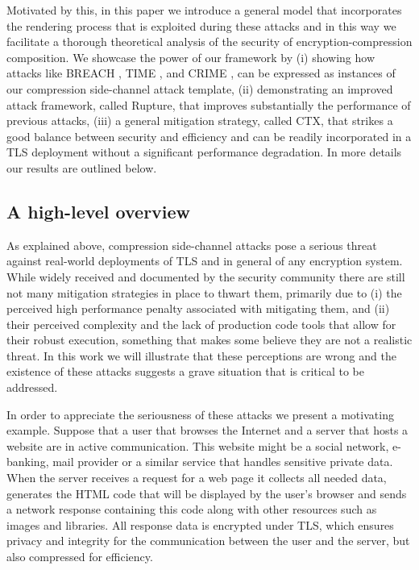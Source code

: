 \documentclass[conference, letterpaper, 10pt]{IEEEtran}
\begin{document}
Motivated by this, in this paper we introduce
a general model that incorporates the rendering process that is exploited
during these attacks and in this way we facilitate a thorough
theoretical analysis of the security of encryption-compression composition.
We showcase the power of our framework by (i) showing how attacks like  BREACH \cite{c2}, TIME \cite{c3}, and CRIME \cite{c4}, can be expressed
as instances of our compression side-channel attack template,
(ii) demonstrating an improved attack framework, called Rupture,
that improves substantially the performance of previous attacks,
(iii) a general mitigation strategy, called CTX, that strikes
a good balance between security and efficiency and can be readily incorporated
in a TLS deployment without a significant performance degradation.
In more details our results are outlined below.

\subsection{A high-level overview}\label{subsec:example}
As explained above,  compression side-channel attacks pose a serious threat
against real-world deployments of TLS and in general of
any encryption system. While widely received and documented
by the security community there are still not many mitigation strategies in place
to thwart them, primarily due to (i) the perceived high performance
penalty associated with mitigating them, and
(ii) their perceived complexity and
the lack of production code tools
that allow for their robust execution, something that makes some believe
they are not a realistic threat. In this work we will illustrate that
these perceptions  are wrong
and the existence of these attacks
suggests  a grave situation that is critical to be addressed.

In order to appreciate the seriousness of these attacks we present a motivating
example.
Suppose that  a  user that browses the Internet and a server
that hosts a website are in active communication.
This website might be a social network, e-banking, mail
provider or a similar service that handles sensitive private data. When the
server receives a request for a web page it collects all needed data, generates
the HTML code that will be displayed by the user's browser and sends a network
response containing this code along with other resources such as images and
libraries. All response data is encrypted under TLS, which ensures privacy and
integrity for the communication between the user and the server,
but also compressed for efficiency.
\end{document}
